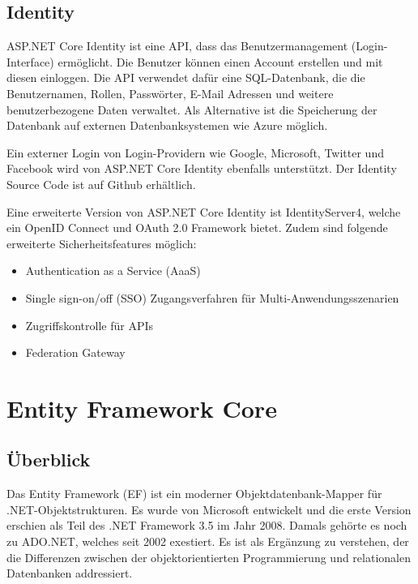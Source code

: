 \subsection{Identity}
\cite{ASPIdentityDoc}
\cite{ASPIdentityDocOld}

ASP.NET Core Identity ist eine API, dass das Benutzermanagement (Login-Interface) ermöglicht. 
Die Benutzer können einen Account erstellen und mit diesen einloggen. Die API verwendet dafür eine 
SQL-Datenbank, die die Benutzernamen, Rollen, Passwörter, E-Mail Adressen und weitere benutzerbezogene Daten verwaltet. 
Als Alternative ist die Speicherung der Datenbank auf externen Datenbanksystemen wie Azure möglich.

Ein externer Login von Login-Providern wie Google, Microsoft, Twitter und Facebook wird von ASP.NET Core Identity ebenfalls unterstützt.
Der Identity Source Code ist auf Github erhältlich.

Eine erweiterte Version von ASP.NET Core Identity ist IdentityServer4, welche ein OpenID Connect und OAuth 2.0 Framework bietet.
Zudem sind folgende erweiterte Sicherheitsfeatures möglich:

\begin{itemize}
    \item Authentication as a Service (AaaS)
    \item Single sign-on/off (SSO) Zugangsverfahren für Multi-Anwendungsszenarien
    \item Zugriffskontrolle für APIs
    \item Federation Gateway
\end{itemize}

\newpage
\section{Entity Framework Core}
\subsection{Überblick}
\cite{CSharp8Rheinwerk}
\cite{EFCoreDocumentation}
\cite{EFCoreWikipedia}

Das Entity Framework (EF) ist ein moderner Objektdatenbank-Mapper für .NET-Objektstrukturen. Es
wurde von Microsoft entwickelt und die erste Version erschien als Teil des .NET Framework 3.5 im
Jahr 2008. Damals gehörte es noch zu ADO.NET, welches seit 2002 exestiert.  Es ist als Ergänzung zu verstehen, 
der die Differenzen zwischen der objektorientierten Programmierung und relationalen Datenbanken addressiert.


